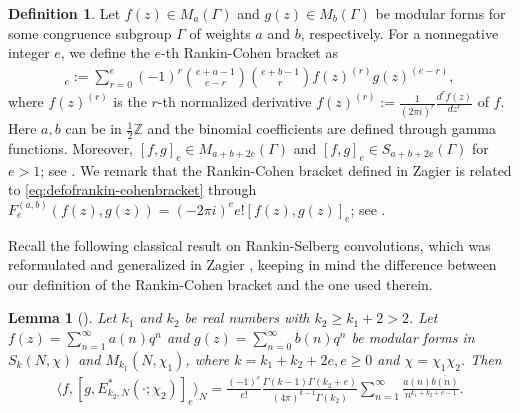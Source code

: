 \documentclass[11pt,letterpaper,reqno]{amsart}
\newcommand\ques[1]{\textcolor{blue}{\textbf{Question}: #1}}
\numberwithin{figure}{section}
\numberwithin{table}{section}
\theoremstyle{definition}
\theoremstyle{plain}
\newtheorem{lemma}[theorem]{Lemma}
\theoremstyle{definition}
\newtheorem{definition}{Definition}[section]
\theoremstyle{definition}
\theoremstyle{remark}
\numberwithin{equation}{section}
\theoremstyle{remark}
\begin{document}
\begin{definition}\label{def:rankincohen}
Let $f(z)\in M_{a}(\Gamma)$ and $g(z)\in M_b(\Gamma)$ be modular forms for some congruence subgroup $\Gamma$ of weights $a$ and $b$, respectively. For a nonnegative integer $e$, we define the $e$-th Rankin-Cohen bracket as 
\begin{align}
    [f(z),g(z)]_e := \sum_{r=0}^e (-1)^r\binom{e+a-1}{e-r}\binom{e+b-1}{r}f(z)^{(r)}g(z)^{(e-r)},\label{eq:defofrankin-cohenbracket}
\end{align}
where $f(z)^{(r)}$ is the $r$-th normalized derivative $f(z)^{(r)}:=\frac{1}{(2\pi i)^r}\frac{d^r f(z)}{dz^r}$ of $f$. Here $a,b$ can be in $\frac{1}{2}\mathbb{Z}$ and the binomial coefficients are defined through gamma functions. Moreover, $[f,g]_e\in M_{a+b+2e}(\Gamma)$ and $[f,g]_e\in S_{a+b+2e}(\Gamma)$ for $e>1$; see \cite[Theorem 7.1]{Cohen'smodularformC_k}. We remark that the Rankin-Cohen bracket defined in Zagier \cite[(73)]{Zagier1976} is related to \eqref{eq:defofrankin-cohenbracket} through $F_{e}^{(a,b)}(f(z),g(z))= (-2\pi i)^e e![f(z),g(z)]_e$; see  \cite[(1.1)]{evenperiods}.
\end{definition}



Recall the following classical result on Rankin-Selberg convolutions, which was reformulated and generalized in Zagier \cite{Zagier1976}, keeping in mind the difference between our definition of the Rankin-Cohen bracket and the one used therein.
\begin{lemma}[{\cite[Propsition 6]{Zagier1976}\label{lem:RankinSelbergZagier}}]
Let $k_1$ and $k_2$ be real numbers with $k_2\geq k_1+2>2$. Let $f(z)=\sum_{n=1}^{\infty}a(n)q^n$ and $g(z)=\sum_{n=0}^{\infty}b(n)q^n$ be modular forms in $S_k(N,\chi)$ and $M_{k_1}(N,\chi_1)$, where $k=k_1+k_2+2e, e\geq0$ and $\chi=\chi_1\chi_2$. 
Then 
    \begin{align}
        \langle f,[g,E^*_{k_2,N}(\cdot;\chi_2)]_e\rangle_{N}=\frac{(-1)^e}{e!}\frac{\Gamma(k-1)\Gamma(k_2+e)}{(4\pi)^{k-1}\Gamma(k_2)}\sum_{n=1}^{\infty}\frac{a(n)\overline{b(n)}}{n^{k_1+k_2+e-1}}.\label{eq:RankinSelberg}
    \end{align}
\end{lemma}
\end{document}

